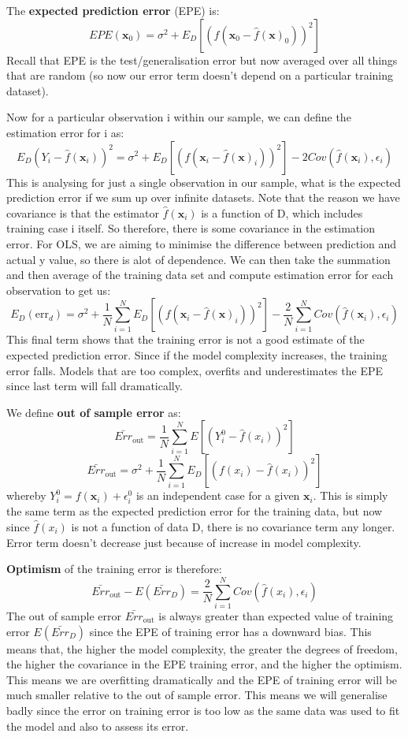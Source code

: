 \documentclass[11pt, oneside]{article}
\theoremstyle{definition}
\begin{document}
The \textbf{expected prediction error} (EPE) is:
$$
EPE(\bm{x}_0) = \sigma^2 + E_D[(f(\bm{x}_0 - \hat{f}(\bm{x})_0))^2]
$$
Recall that EPE is the test/generalisation error but now averaged over all things that are random (so now our error term doesn't depend on a particular training dataset).

Now for a particular observation i within our sample, we can define the estimation error for i as:
$$
E_D(Y_i - \hat{f}(\bm{x}_i))^2 = \sigma^2 + E_D[(f(\bm{x}_i - \hat{f}(\bm{x})_i))^2] - 2Cov(\hat{f}(\bm{x}_i),\epsilon_i)
$$
This is analysing for just a single observation in our sample, what is the expected prediction error if we sum up over infinite datasets. Note that the reason we have covariance is that the estimator $\hat{f}(\bm{x}_i)$ is a function of D, which includes training case i itself. So therefore, there is some covariance in the estimation error. For OLS, we are aiming to minimise the difference between prediction and actual y value, so there is alot of dependence. We can then take the summation and then average of the training data set and compute estimation error for each observation to get us:
$$
E_D(\text{err}_d) = \sigma^2 + \frac{1}{N}\sum\limits_{i=1}^NE_D[(f(\bm{x}_i - \hat{f}(\bm{x})_i))^2] - \frac{2}{N}\sum\limits_{i=1}^NCov(\hat{f}(\bm{x}_i),\epsilon_i)
$$
This final term shows that the training error is not a good estimate of the expected prediction error. Since if the model complexity increases, the training error falls. Models that are too complex, overfits and underestimates the EPE since last term will fall dramatically.

We define \textbf{out of sample error} as:
$$
\bar{Err}_{\text{out}} = \frac{1}{N}\sum\limits_{i=1}^NE[(Y_i^0 - \hat{f}(x_i))^2]
$$
$$
\bar{Err}_{\text{out}} = \sigma^2 +  \frac{1}{N}\sum\limits_{i=1}^NE_D[(f(x_i) - \hat{f}(x_i))^2]
$$
whereby $Y_i^0 = f(\bm{x}_i) + \epsilon_i^0$ is an independent case for a given $\bm{x}_i$. This is simply the same term as the expected prediction error for the training data, but now since $\hat{f}(x_i)$ is not a function of data D, there is no covariance term any longer. Error term doesn't decrease just because of increase in model complexity.

\textbf{Optimism} of the training error is therefore:
$$
\bar{Err}_{\text{out}} - E(\bar{Err}_D) = \frac{2}{N}\sum\limits_{i=1}^NCov(\hat{f}(x_i),\epsilon_i)
$$
The out of sample error $\bar{Err}_{\text{out}}$ is always greater than expected value of training error $E(\bar{Err}_D)$ since the EPE of training error has a downward bias. This means that, the higher the model complexity, the greater the degrees of freedom, the higher the covariance in the EPE training error, and the higher the optimism. This means we are overfitting dramatically and the EPE of training error will be much smaller relative to the out of sample error. This means we will generalise badly since the error on training error is too low as the same data was used to fit the model and also to assess its error.
\end{document}
